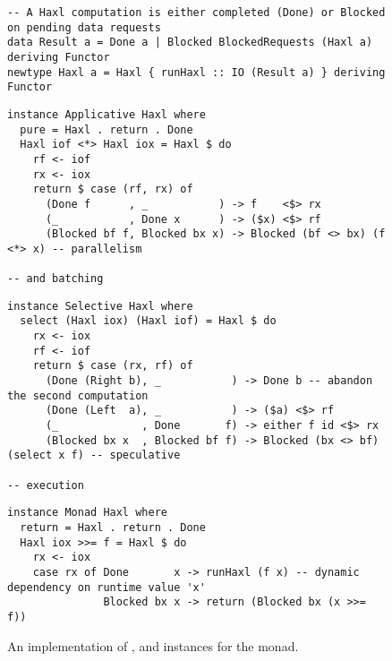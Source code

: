 \begin{figure}
\begin{verbatim}
-- A Haxl computation is either completed (Done) or Blocked on pending data requests
data Result a = Done a | Blocked BlockedRequests (Haxl a) deriving Functor
newtype Haxl a = Haxl { runHaxl :: IO (Result a) } deriving Functor
\end{verbatim}
\vspace{0mm}
\begin{verbatim}
instance Applicative Haxl where
  pure = Haxl . return . Done
  Haxl iof <*> Haxl iox = Haxl $ do
    rf <- iof
    rx <- iox
    return $ case (rf, rx) of
      (Done f      , _           ) -> f    <$> rx
      (_           , Done x      ) -> ($x) <$> rf
      (Blocked bf f, Blocked bx x) -> Blocked (bf <> bx) (f <*> x) -- parallelism
                                                                   -- and batching
\end{verbatim}
\vspace{-3.5mm}
\begin{verbatim}
instance Selective Haxl where
  select (Haxl iox) (Haxl iof) = Haxl $ do
    rx <- iox
    rf <- iof
    return $ case (rx, rf) of
      (Done (Right b), _           ) -> Done b -- abandon the second computation
      (Done (Left  a), _           ) -> ($a) <$> rf
      (_             , Done       f) -> either f id <$> rx
      (Blocked bx x  , Blocked bf f) -> Blocked (bx <> bf) (select x f) -- speculative
                                                                        -- execution
\end{verbatim}
\vspace{-3.5mm}
\begin{verbatim}
instance Monad Haxl where
  return = Haxl . return . Done
  Haxl iox >>= f = Haxl $ do
    rx <- iox
    case rx of Done       x -> runHaxl (f x) -- dynamic dependency on runtime value 'x'
               Blocked bx x -> return (Blocked bx (x >>= f))
\end{verbatim}
\vspace{-2mm}
\caption{An implementation of ,  and 
instances for the \Haxl monad.}
\label{fig-haxl}
\vspace{-3mm}
\end{figure}

